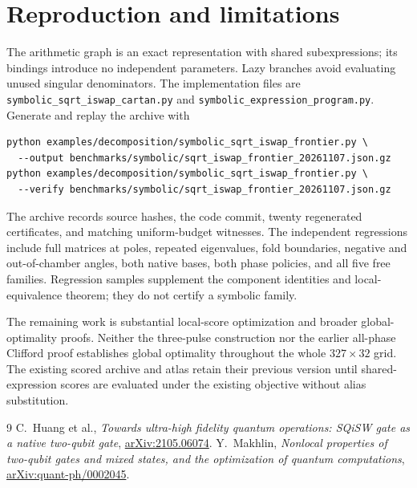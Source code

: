 \documentclass[11pt]{article}
\begin{document}
\section{Reproduction and limitations}
The arithmetic graph is an exact representation with shared subexpressions;
its bindings introduce no independent parameters. Lazy branches avoid
evaluating unused singular denominators. The implementation files are
\texttt{symbolic\_sqrt\_iswap\_cartan.py} and
\texttt{symbolic\_expression\_program.py}. Generate and replay the archive with
\begin{verbatim}
python examples/decomposition/symbolic_sqrt_iswap_frontier.py \
  --output benchmarks/symbolic/sqrt_iswap_frontier_20261107.json.gz
python examples/decomposition/symbolic_sqrt_iswap_frontier.py \
  --verify benchmarks/symbolic/sqrt_iswap_frontier_20261107.json.gz
\end{verbatim}
The archive records source hashes, the code commit, twenty regenerated
certificates, and matching uniform-budget witnesses. The independent
regressions include full matrices at poles, repeated eigenvalues, fold
boundaries, negative and out-of-chamber angles, both native bases, both
phase policies, and all five free families. Regression samples supplement
the component identities and local-equivalence theorem; they do not
certify a symbolic family.

The remaining work is substantial local-score optimization and broader
global-optimality proofs. Neither the three-pulse construction nor the
earlier all-phase Clifford proof establishes global optimality throughout
the whole $327\times32$ grid. The existing scored archive and atlas retain
their previous version until shared-expression scores are evaluated under
the existing objective without alias substitution.

\begin{thebibliography}{9}
 C.~Huang et al., \emph{Towards ultra-high fidelity quantum
operations: SQiSW gate as a native two-qubit gate},
\href{https://arxiv.org/abs/2105.06074}{arXiv:2105.06074}.
\bibitem{makhlin} Y.~Makhlin, \emph{Nonlocal properties of two-qubit gates
and mixed states, and the optimization of quantum computations},
\href{https://arxiv.org/abs/quant-ph/0002045}{arXiv:quant-ph/0002045}.
\end{thebibliography}
\end{document}
